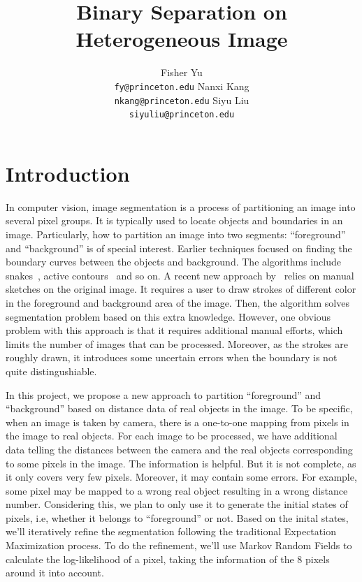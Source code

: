 \documentclass{article} %
\title{Binary Separation on Heterogeneous Image}
\author{
Fisher Yu \\
\texttt{fy@princeton.edu}
\And
Nanxi Kang \\
\texttt{nkang@princeton.edu} 
\And
Siyu Liu\\
\texttt{siyuliu@princeton.edu}
}
\begin{document}
\maketitle

\section{Introduction}

In computer vision, image segmentation is a process of partitioning an 
image into several pixel groups. It is typically
 used to locate objects and boundaries in an image. Particularly, how
 to partition an image into two segments: ``foreground''
 and ``background'' is of special interest. Earlier techniques focused 
on finding the boundary curves between the objects and background. 
The algorithms include snakes~\citep{Kass1988snakes}, active 
contours~\citep{Isard1998condensation} and so on. A recent new approach 
by~\citet{Boykov2006graph} relies on manual sketches on the original
 image. It requires a user to draw strokes of different color in the foreground 
and background area of the image. Then, the algorithm solves segmentation
problem based on this extra knowledge. However, one obvious problem
with this approach is that it requires additional manual efforts,
which limits the number of images that can be processed. Moreover, as
the strokes are roughly drawn, it introduces some uncertain errors
when the boundary is not quite distingushiable.

In this project, we propose a new approach to partition ``foreground''
and ``background'' based on distance data of real objects in the image.
To be specific, when an image is taken by camera, there is a
one-to-one mapping from pixels in the image to real objects. 
For each image to be processed, we have additional data telling the 
distances between the camera and the real objects corresponding to some
 pixels in the image. The information is helpful. But it is not
 complete, as it only covers very few pixels. Moreover, it may contain
 some errors. For example, some pixel may be mapped to a wrong real
 object resulting in a wrong distance number. Considering this, we
 plan to only use it to generate the initial states of pixels, i.e,
 whether it belongs to ``foreground'' or not. Based on the inital
 states, we'll iteratively refine the segmentation following the
 traditional Expectation Maximization process. To do the refinement,
 we'll use Markov Random Fields to calculate the log-likelihood of a
 pixel, taking the information of the 8 pixels around it into account.
\end{document}
